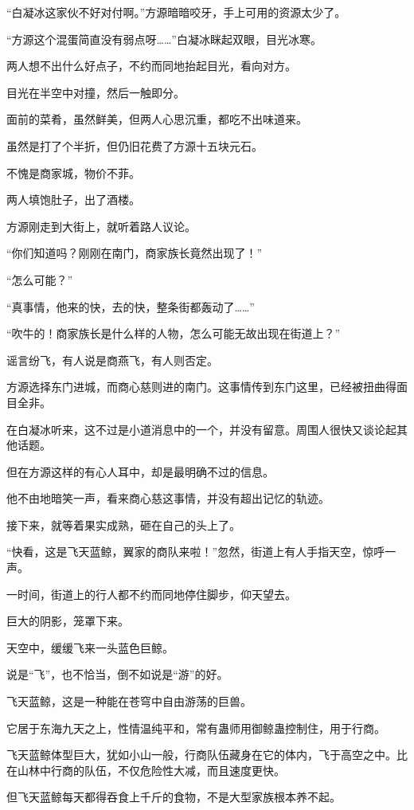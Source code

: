 \begin{this_body}
“白凝冰这家伙不好对付啊。”方源暗暗咬牙，手上可用的资源太少了。

“方源这个混蛋简直没有弱点呀……”白凝冰眯起双眼，目光冰寒。

两人想不出什么好点子，不约而同地抬起目光，看向对方。

目光在半空中对撞，然后一触即分。

面前的菜肴，虽然鲜美，但两人心思沉重，都吃不出味道来。

虽然是打了个半折，但仍旧花费了方源十五块元石。

不愧是商家城，物价不菲。

两人填饱肚子，出了酒楼。

方源刚走到大街上，就听着路人议论。

“你们知道吗？刚刚在南门，商家族长竟然出现了！”

“怎么可能？”

“真事情，他来的快，去的快，整条街都轰动了……”

“吹牛的！商家族长是什么样的人物，怎么可能无故出现在街道上？”

谣言纷飞，有人说是商燕飞，有人则否定。

方源选择东门进城，而商心慈则进的南门。这事情传到东门这里，已经被扭曲得面目全非。

在白凝冰听来，这不过是小道消息中的一个，并没有留意。周围人很快又谈论起其他话题。

但在方源这样的有心人耳中，却是最明确不过的信息。

他不由地暗笑一声，看来商心慈这事情，并没有超出记忆的轨迹。

接下来，就等着果实成熟，砸在自己的头上了。

“快看，这是飞天蓝鲸，翼家的商队来啦！”忽然，街道上有人手指天空，惊呼一声。

一时间，街道上的行人都不约而同地停住脚步，仰天望去。

巨大的阴影，笼罩下来。

天空中，缓缓飞来一头蓝色巨鲸。

说是“飞”，也不恰当，倒不如说是“游”的好。

飞天蓝鲸，这是一种能在苍穹中自由游荡的巨兽。

它居于东海九天之上，性情温纯平和，常有蛊师用御鲸蛊控制住，用于行商。

飞天蓝鲸体型巨大，犹如小山一般，行商队伍藏身在它的体内，飞于高空之中。比在山林中行商的队伍，不仅危险性大减，而且速度更快。

但飞天蓝鲸每天都得吞食上千斤的食物，不是大型家族根本养不起。


\end{this_body}

